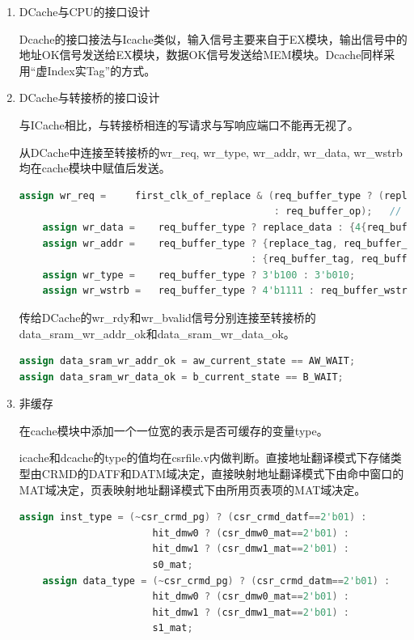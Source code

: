 \documentclass[11pt]{article}
\begin{document}
\begin{enumerate}
    \item DCache与CPU的接口设计

    Dcache的接口接法与Icache类似，输入信号主要来自于EX模块，输出信号中的地址OK信号发送给EX模块，数据OK信号发送给MEM模块。Dcache同样采用“虚Index实Tag”的方式。

    \item DCache与转接桥的接口设计

    与ICache相比，与转接桥相连的写请求与写响应端口不能再无视了。

    从DCache中连接至转接桥的wr\_req, wr\_type, wr\_addr, wr\_data, wr\_wstrb均在cache模块中赋值后发送。

    \begin{lstlisting}[language=verilog]
    assign wr_req =     first_clk_of_replace & (req_buffer_type ? (replace_d & replace_v)
                                            : req_buffer_op);   // non-cache write
    assign wr_data =    req_buffer_type ? replace_data : {4{req_buffer_wdata}};
    assign wr_addr =    req_buffer_type ? {replace_tag, req_buffer_index, 4'b0} 
                                        : {req_buffer_tag, req_buffer_index, req_buffer_offset};
    assign wr_type =    req_buffer_type ? 3'b100 : 3'b010;
    assign wr_wstrb =   req_buffer_type ? 4'b1111 : req_buffer_wstrb;
    \end{lstlisting}
    
    传给DCache的wr\_rdy和wr\_bvalid信号分别连接至转接桥的data\_sram\_wr\_addr\_ok和data\_sram\_wr\_data\_ok。

    \begin{lstlisting}[language=verilog]
assign data_sram_wr_addr_ok = aw_current_state == AW_WAIT;
assign data_sram_wr_data_ok = b_current_state == B_WAIT;
    \end{lstlisting}

    \item 非缓存

    在cache模块中添加一个一位宽的表示是否可缓存的变量type。

    icache和dcache的type的值均在csrfile.v内做判断。直接地址翻译模式下存储类型由CRMD的DATF和DATM域决定，直接映射地址翻译模式下由命中窗口的MAT域决定，页表映射地址翻译模式下由所用页表项的MAT域决定。

    \begin{lstlisting}[language=verilog]
    assign inst_type = (~csr_crmd_pg) ? (csr_crmd_datf==2'b01) :
                       hit_dmw0 ? (csr_dmw0_mat==2'b01) :
                       hit_dmw1 ? (csr_dmw1_mat==2'b01) :
                       s0_mat;
    assign data_type = (~csr_crmd_pg) ? (csr_crmd_datm==2'b01) :
                       hit_dmw0 ? (csr_dmw0_mat==2'b01) :
                       hit_dmw1 ? (csr_dmw1_mat==2'b01) :
                       s1_mat;
    \end{lstlisting}


\end{enumerate}
\end{document}
